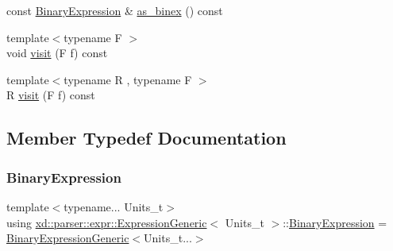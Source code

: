 \begin{DoxyCompactItemize}
const \mbox{\hyperlink{structxd_1_1parser_1_1expr_1_1_expression_generic_a2bc00be3a5e572a1bee429bcda5943d8}{Binary\+Expression}} \& \mbox{\hyperlink{structxd_1_1parser_1_1expr_1_1_expression_generic_abf73f347c0ae244db1670568646a97a8}{as\+\_\+binex}} () const
\item 
{\footnotesize template$<$typename F $>$ }\\void \mbox{\hyperlink{structxd_1_1parser_1_1expr_1_1_expression_generic_a92d424b2b6764aaad0074fa5cbcc80af}{visit}} (F f) const
\item 
{\footnotesize template$<$typename R , typename F $>$ }\\R \mbox{\hyperlink{structxd_1_1parser_1_1expr_1_1_expression_generic_aaefa9e6adab7a545be4056068ffc0db3}{visit}} (F f) const
\end{DoxyCompactItemize}


\subsection{Member Typedef Documentation}
\mbox{\label{structxd_1_1parser_1_1expr_1_1_expression_generic_a2bc00be3a5e572a1bee429bcda5943d8}} 
\subsubsection{\texorpdfstring{Binary\+Expression}{BinaryExpression}}
{\footnotesize\ttfamily template$<$typename... Units\+\_\+t$>$ \\
using \mbox{\hyperlink{structxd_1_1parser_1_1expr_1_1_expression_generic}{xd\+::parser\+::expr\+::\+Expression\+Generic}}$<$ Units\+\_\+t $>$\+::\mbox{\hyperlink{structxd_1_1parser_1_1expr_1_1_expression_generic_a2bc00be3a5e572a1bee429bcda5943d8}{Binary\+Expression}} =  \mbox{\hyperlink{structxd_1_1parser_1_1expr_1_1_binary_expression_generic}{Binary\+Expression\+Generic}}$<$Units\+\_\+t...$>$}

\mbox{\label{structxd_1_1parser_1_1expr_1_1_expression_generic_af3290b56362f6bc7ca516b947905c42c}} 

